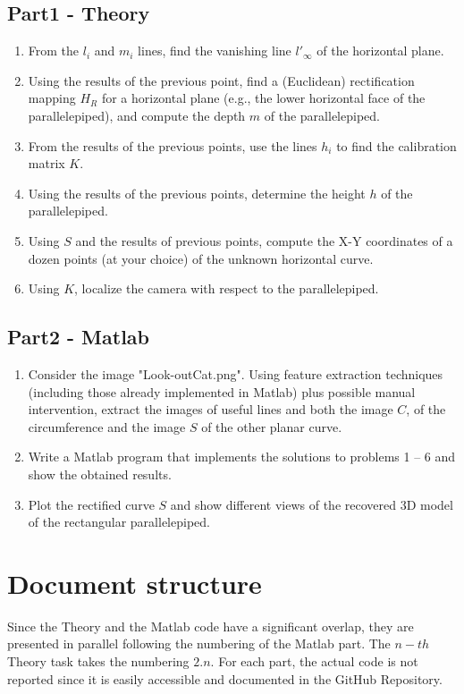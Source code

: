 \subsection{Part1 - Theory}
\begin{enumerate}
    \item From the $l_i$ and $m_i$ lines, find the vanishing line $l'_\infty$ of the horizontal plane. 
    \item Using the results of the previous point, find a (Euclidean) rectification mapping $H_R$ for a horizontal plane (e.g., the lower horizontal face of the parallelepiped), and compute the depth $m$ of the parallelepiped.  
    \item From the results of the previous points, use the lines $h_i$ to find the calibration matrix $K$. 
    \item Using the results of the previous points, determine the height $h$ of the parallelepiped.  
    \item Using $S$ and the results of previous points, compute the X-Y coordinates of a dozen points (at your choice) of the unknown horizontal curve. 
    \item Using $K$, localize the camera with respect to the parallelepiped.
\end{enumerate}

\subsection{Part2 - Matlab}
\begin{enumerate}
    \item Consider the image "Look-outCat.png". Using feature extraction techniques (including those already implemented in Matlab) plus possible manual intervention, extract the images of useful lines and both the image $C$, of the circumference and the image $S$ of the other planar curve. 
    \item Write a Matlab program that implements the solutions to problems 1 – 6 and show the obtained results. 
    \item Plot the rectified curve $S$ and show different views of the recovered 3D model of the 
rectangular parallelepiped. 
\end{enumerate}

\section{Document structure}
Since the Theory and the Matlab code have a significant overlap, they are presented in parallel following the numbering of the Matlab part. The $n-th $ Theory task takes the numbering $2.n$. For each part, the actual code is not reported since it is easily accessible and documented in the GitHub Repository.